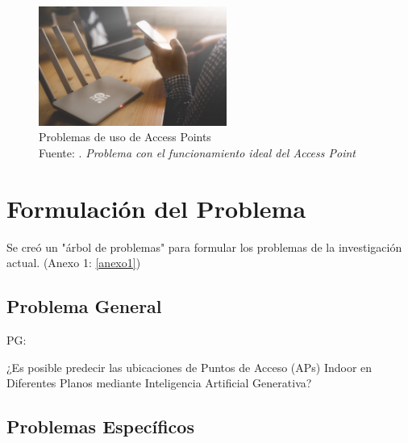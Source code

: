 \begin{figure}[h]
	\begin{center}
		\includegraphics[width=0.55\textwidth]{1/figures/access-point-1.jpeg}
		\caption[Problemas de uso de Access Points]{Problemas de uso de Access Points\\
		Fuente: \cite{ot_napit2017ap}. \textit{Problema con el funcionamiento ideal del Access Point}}
		\label{1:fig2}
	\end{center}
\end{figure}

\section{Formulación del Problema}
Se creó un "árbol de problemas" para formular los problemas de la investigación actual. (Anexo 1: \ref{anexo1})

\subsection{Problema General}
PG: \newcommand{\ProblemaGeneral}{
¿Es posible predecir las ubicaciones de Puntos de Acceso (APs) Indoor en Diferentes Planos  mediante Inteligencia Artificial Generativa?
}
\ProblemaGeneral
\subsection{Problemas Específicos}
\newcommand{\Pbone}{
¿Cómo se puede modelar de manera efectiva la distribución espacial de usuarios y obstáculos en un entorno interior para predecir la cobertura inalámbrica?
}
\newcommand{\Pbtwo}{
¿Qué enfoques de inteligencia artificial generativa son más adecuados para generar ubicaciones óptimas de APs en entornos interiores?
}
\newcommand{\Pbthree}{
¿Cómo puedo encontrar una base de datos eficiente y robusta que almacene información detallada y precisa sobre la infraestructura de edificios y características de entornos indoor?
}
\newcommand{\Pbfour}{
¿Cuáles son las métricas y metodologías de evaluación más adecuadas para medir la eficiencia y efectividad de las predicciones de ubicaciones óptimas de puntos de acceso (APs) generadas por modelos de inteligencia artificial generativa en entornos indoor?
}

